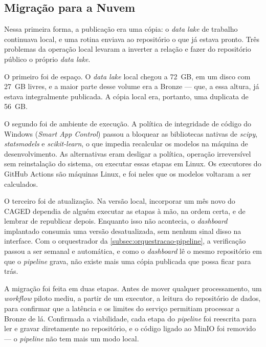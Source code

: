 \subsection{Migração para a Nuvem}
\label{subsec:migracao}

Nessa primeira forma, a publicação era uma cópia: o \textit{data lake} de trabalho continuava local, e uma rotina enviava ao repositório o que já estava pronto. Três problemas da operação local levaram a inverter a relação e fazer do repositório público o próprio \textit{data lake}.

O primeiro foi de espaço. O \textit{data lake} local chegou a 72~GB, em um disco com 27~GB livres, e a maior parte desse volume era a Bronze --- que, a essa altura, já estava integralmente publicada. A cópia local era, portanto, uma duplicata de 56~GB.

O segundo foi de ambiente de execução. A política de integridade de código do Windows (\textit{Smart App Control}) passou a bloquear as bibliotecas nativas de \textit{scipy}, \textit{statsmodels} e \textit{scikit-learn}, o que impedia recalcular os modelos na máquina de desenvolvimento. As alternativas eram desligar a política, operação irreversível sem reinstalação do sistema, ou executar essas etapas em Linux. Os executores do GitHub Actions são máquinas Linux, e foi neles que os modelos voltaram a ser calculados.

O terceiro foi de atualização. Na versão local, incorporar um mês novo do CAGED dependia de alguém executar as etapas à mão, na ordem certa, e de lembrar de republicar depois. Enquanto isso não acontecia, o \textit{dashboard} implantado consumia uma versão desatualizada, sem nenhum sinal disso na interface. Com o orquestrador da \autoref{subsec:orquestracao-pipeline}, a verificação passou a ser semanal e automática, e como o \textit{dashboard} lê o mesmo repositório em que o \textit{pipeline} grava, não existe mais uma cópia publicada que possa ficar para trás.

A migração foi feita em duas etapas. Antes de mover qualquer processamento, um \textit{workflow} piloto mediu, a partir de um executor, a leitura do repositório de dados, para confirmar que a latência e os limites do serviço permitiam processar a Bronze de lá. Confirmada a viabilidade, cada etapa do \textit{pipeline} foi reescrita para ler e gravar diretamente no repositório, e o código ligado ao MinIO foi removido --- o \textit{pipeline} não tem mais um modo local.

